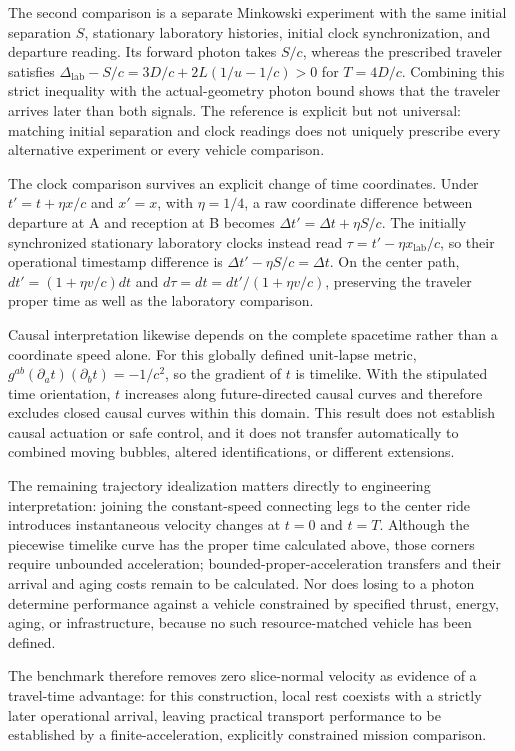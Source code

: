 \documentclass[11pt]{article}
\begin{document}
The second comparison is a separate Minkowski experiment with the same initial separation $S$, stationary laboratory histories, initial clock synchronization, and departure reading. Its forward photon takes $S/c$, whereas the prescribed traveler satisfies $\Delta_{\mathrm{lab}}-S/c=3D/c+2L(1/u-1/c)>0$ for $T=4D/c$. Combining this strict inequality with the actual-geometry photon bound shows that the traveler arrives later than both signals. The reference is explicit but not universal: matching initial separation and clock readings does not uniquely prescribe every alternative experiment or every vehicle comparison.

The clock comparison survives an explicit change of time coordinates. Under $t'=t+\eta x/c$ and $x'=x$, with $\eta=1/4$, a raw coordinate difference between departure at A and reception at B becomes $\Delta t'=\Delta t+\eta S/c$. The initially synchronized stationary laboratory clocks instead read $\tau=t'-\eta x_{\mathrm{lab}}/c$, so their operational timestamp difference is $\Delta t'-\eta S/c=\Delta t$. On the center path, $dt'=(1+\eta v/c)dt$ and $d\tau=dt=dt'/(1+\eta v/c)$, preserving the traveler proper time as well as the laboratory comparison.

Causal interpretation likewise depends on the complete spacetime rather than a coordinate speed alone. For this globally defined unit-lapse metric, $g^{ab}(\partial_a t)(\partial_b t)=-1/c^2$, so the gradient of $t$ is timelike. With the stipulated time orientation, $t$ increases along future-directed causal curves and therefore excludes closed causal curves within this domain. This result does not establish causal actuation or safe control, and it does not transfer automatically to combined moving bubbles, altered identifications, or different extensions.

The remaining trajectory idealization matters directly to engineering interpretation: joining the constant-speed connecting legs to the center ride introduces instantaneous velocity changes at $t=0$ and $t=T$. Although the piecewise timelike curve has the proper time calculated above, those corners require unbounded acceleration; bounded-proper-acceleration transfers and their arrival and aging costs remain to be calculated. Nor does losing to a photon determine performance against a vehicle constrained by specified thrust, energy, aging, or infrastructure, because no such resource-matched vehicle has been defined.

The benchmark therefore removes zero slice-normal velocity as evidence of a travel-time advantage: for this construction, local rest coexists with a strictly later operational arrival, leaving practical transport performance to be established by a finite-acceleration, explicitly constrained mission comparison.
\end{document}
